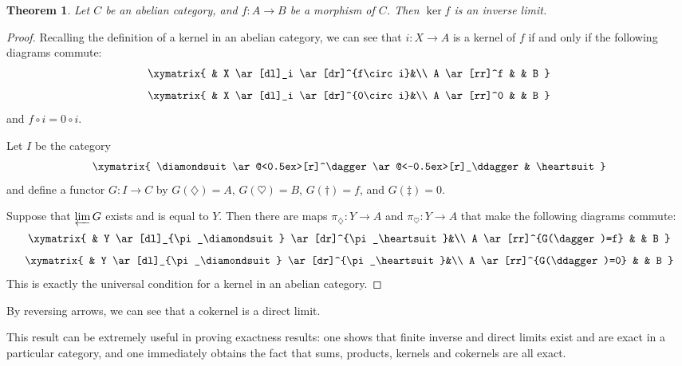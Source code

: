 \documentclass[12pt]{article}
\newtheorem{theorem}{Theorem}
\DeclareMathOperator{\liminv}{\varprojlim}
\begin{document}
\begin{theorem}
Let $C$ be an abelian category, and $f\colon A\to B$ be a morphism of $C$.  Then $\ker f$ is an inverse limit. 
\end{theorem}
\begin{proof}
Recalling the definition of a kernel in an abelian category, we can see that $i\colon X\to A$ is a kernel of $f$ if and only if the following diagrams commute:
\[
\xymatrix{
& X \ar[dl]_i \ar[dr]^{f\circ i}&\\
A \ar[rr]^f & & B 
}
\]
\[
\xymatrix{
& X \ar[dl]_i \ar[dr]^{0\circ i}&\\
A \ar[rr]^0 & & B 
}
\]
and $f\circ i = 0\circ i$. 

Let $I$ be the category
\[
\xymatrix{
\diamondsuit \ar@<0.5ex>[r]^\dagger \ar@<-0.5ex>[r]_\ddagger & \heartsuit
}
\]
and define a functor $G\colon I\to C$ by 
$G(\diamondsuit)=A$, 
$G(\heartsuit)=B$, 
$G(\dagger) = f$, and 
$G(\ddagger) = 0$.  

Suppose that $\liminv G$ exists and is equal to $Y$.  Then there are maps $\pi_\diamondsuit\colon Y\to A$ and $\pi_\heartsuit\colon Y\to A$ that make the following diagrams commute:
\[
\xymatrix{
& Y \ar[dl]_{\pi_\diamondsuit} \ar[dr]^{\pi_\heartsuit}&\\
A \ar[rr]^{G(\dagger)=f} & & B 
}
\]
\[
\xymatrix{
& Y \ar[dl]_{\pi_\diamondsuit} \ar[dr]^{\pi_\heartsuit}&\\
A \ar[rr]^{G(\ddagger)=0} & & B 
}
\]
This is exactly the universal condition for a kernel in an abelian category.
\end{proof}

By reversing arrows, we can see that a cokernel is a direct limit.

This result can be extremely useful in proving exactness results: one shows that finite inverse and direct limits exist and are exact in a particular category, and one immediately obtains the fact that sums, products, kernels and cokernels are all exact.
\end{document}
